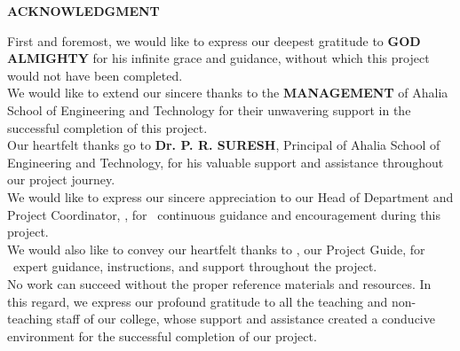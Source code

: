 \newpage
\thispagestyle{empty}

\begin{center}
	\fontsize{16}{18} 
	\textbf{ACKNOWLEDGMENT}\\
\end{center}

\vspace{0.2in}

\fontsize{12}{14}
\noindent First and foremost, we would like to express our deepest gratitude to \textbf{GOD ALMIGHTY} for his infinite grace and guidance, without which this project would not have been completed.\\

\noindent We would like to extend our sincere thanks to the \textbf{MANAGEMENT} of Ahalia School of Engineering and Technology for their unwavering support in the successful completion of this project.\\

\noindent Our heartfelt thanks go to \textbf{Dr. P. R. SURESH}, Principal of Ahalia School of Engineering and Technology, for his valuable support and assistance throughout our project journey.\\

\noindent We would like to express our sincere appreciation to our Head of Department and Project Coordinator, \textbf{\hodCaps}, for \genderpronoun{\hodpronoun}\ continuous guidance and encouragement during this project.\\

\noindent We would also like to convey our heartfelt thanks to \textbf{\projguideCaps}, our Project Guide, for \genderpronoun{\projguidepronoun}\ expert guidance, instructions, and support throughout the project.\\

\noindent No work can succeed without the proper reference materials and resources. In this regard, we express our profound gratitude to all the teaching and non-teaching staff of our college, whose support and assistance created a conducive environment for the successful completion of our project.\\